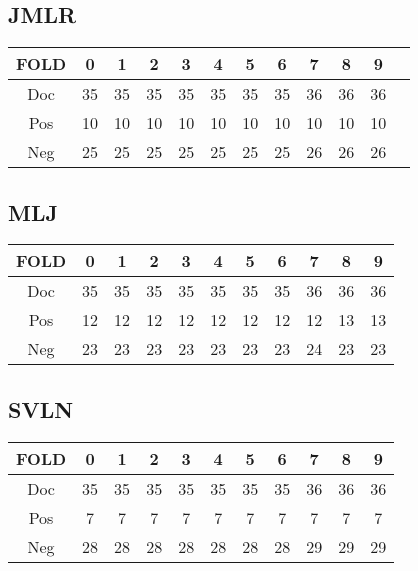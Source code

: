 \subsection{JMLR}
\begin{table}[htbp]
	\centering
		\begin{tabular}{c | ccccccccccc}
			FOLD &  0 &  1 &  2 &  3 &  4 &  5 &  6 &  7 &  8 &  9 \\ \hline
			Doc  & 35 & 35 & 35 & 35 & 35 & 35 & 35 & 36 & 36 & 36 \\
			Pos  & 10  & 10  &  10 &  10 &  10 &  10 &  10 &  10 &  10 &  10 \\
			Neg  & 25 & 25 & 25 & 25 & 25 & 25 & 25 & 26 & 26 & 26 \\
		\end{tabular}%
	\label{tab:JMLR}
\end{table}
\subsection{MLJ}
\begin{table}[htbp]
	\centering
		\begin{tabular}{c | cccccccccc}
			FOLD &  0 &  1 &  2 &  3 &  4 &  5 &  6 &  7 &  8 &  9 \\ \hline
			Doc  & 35 & 35 & 35 & 35 & 35 & 35 & 35 & 36 & 36 & 36 \\
			Pos  & 12  & 12  &  12 &  12 &  12 &  12 &  12 &  12 & 13 & 13 \\
			Neg  & 23 & 23 & 23 & 23 & 23 & 23 & 23 & 24 & 23 & 23 \\
		\end{tabular}
	\label{tab:MLJ}
\end{table}
\subsection{SVLN}
\begin{table}[htbp]
	\centering
		\begin{tabular}{c|cccccccccc}
			FOLD & 0 &  1 &  2 &  3 &  4 &  5 &  6 &  7 &  8 &  9 \\\hline
			Doc  & 35 & 35 & 35 & 35 & 35 & 35 & 35 & 36 & 36 & 36 \\
			Pos  & 7  & 7  &  7 &  7 &  7 &  7 &  7 &  7 &  7 &  7 \\
			Neg  & 28 & 28 & 28 & 28 & 28 & 28 & 28 & 29 & 29 & 29 \\
		\end{tabular}%
	\label{tab:SVLN}
\end{table}
